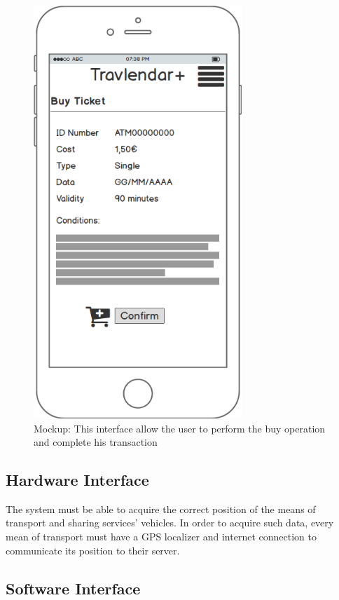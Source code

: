 \documentclass[numbers=noenddot, 12pt, a4paper, oneside]{scrbook}
\begin{document}
\begin{figure}[H]
	\centering
	\includegraphics[width=0.7\textwidth]{mockups/TicketsBuy}
	\caption{Mockup: This interface allow the user to perform the buy operation and complete his transaction}
\end{figure}

\subsection*{Hardware Interface}

The system must be able to acquire the correct position of the means of transport and sharing services' vehicles. In order to acquire such data, every mean of transport must have a GPS localizer and internet connection to communicate its position to their server.

\subsection*{Software Interface}
\end{document}
